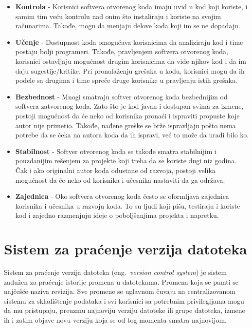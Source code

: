 \documentclass[12pt]{report}
\begin{document}
\begin{itemize}
    \item \textbf{Kontrola} - Korisnici softvera otvorenog koda imaju uvid u kod koji koriste, i samim tim veću kontrolu nad onim što instaliraju i koriste na svojim računarima. Takođe, mogu da menjaju delove koda koji im se ne dopadaju.
    \item \textbf{Učenje} - Dostupnost koda omogućava korisnicima da analiziraju kod i time postaju bolji programeri. Takođe, pravljenjem softvera otvorenog koda, korisnici ostavljaju mogućnost drugim korisnicima da vide njihov kod i da im daju sugestije/kritike. Pri pronalaženju grešaka u kodu, korisnici mogu da ih podele sa drugima i time spreče druge korisnike u pravljenju istih grešaka.
    \item \textbf{Bezbednost} - Mnogi smatraju softver otvorenog koda bezbednijim od softvera zatvorenog koda. Zato što je kod javan i dostupan svima za izmene, postoji mogućnost da će neko od korisnika pronaći i ispraviti propuste koje autor nije primetio. Takođe, nađene greške se brže ispravljaju pošto nema potrebe da se čeka na autora koda da ih ispravi, već to može da uradi bilo ko.
    \item \textbf{Stabilnost} - Softver otvorenog koda se takođe smatra stabilnijim i pouzdanijim rešenjem za projekte koji treba da se koriste dugi niz godina. Čak i ako originalni autor koda odustane od razvoja, postoji velika mogućnost da će neko od korisnika i učesnika nastaviti da ga održava.
    \item \textbf{Zajednica} - Oko softvera otvorenog koda često se oformljava zajednica korisnika i učesnika u razvoju koda. To su ljudi koji pišu, testiraju i koriste kod i zajedno razmenjuju ideje o poboljšanjima projekta i napretku.
\end{itemize}

\section{Sistem za praćenje verzija datoteka}
Sistem za praćenje verzija datoteka (eng.\ \textit{version control system}) je sistem zadužen za praćenje istorije promena u datotekama. Promena koja se pamti se najčešće naziva revizija. Sve promene se uglavnom čuvaju na centralizovanom sistemu za skladištenje podataka i svi korisnici sa potrebnim privilegijama mogu da mu pristupaju, preuzmu najnoviju verziju datoteke ili grupe datoteka, izmene ih i zatim objave novu verziju koja se od tog momenta smatra najnovijom.
\end{document}
